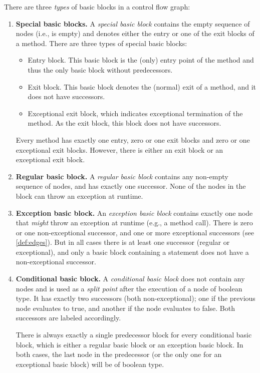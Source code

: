 \begin{definition}
    There are three \emph{types} of basic blocks in a control flow graph:
    \begin{enumerate}
        \item \textbf{Special basic blocks.} A \emph{special basic block} contains
        the empty sequence of nodes (i.e., is empty) and denotes either the
        entry or one of the exit blocks of a method. There are three types
        of special basic blocks:
        \begin{itemize}
            \item Entry block. This basic block is the (only) entry point of the
            method and thus the only basic block without predecessors.
            \item Exit block. This basic block denotes the (normal) exit of
            a method, and it does not have successors.
            \item Exceptional exit block, which indicates exceptional termination
            of the method. As the exit block, this block does not have successors.
        \end{itemize}
        Every method has exactly one entry, zero or one exit blocks and zero or one
        exceptional exit blocks. However, there is either an exit block or an exceptional
        exit block.
        \item \textbf{Regular basic block.} A \emph{regular basic block} contains
        any non-empty sequence of nodes, and has exactly one successor.
        None of the nodes in the block can throw an exception at runtime.
        \item \textbf{Exception basic block.} An \emph{exception basic block} contains exactly
        one node that \emph{might} throw an exception at runtime (e.g., a method call).
        There is zero or one non-exceptional successor, and one
        or more exceptional successors (see \autoref{def:edges}). But in all cases there
        is at least one successor (regular or exceptional), and only a basic block
        containing a  statement does not have a non-exceptional successor.
        \item \textbf{Conditional basic block.} A \emph{conditional basic block}
        does not contain any nodes and is used as a \emph{split point} after the execution
        of a node of boolean type. It has exactly two successors (both non-exceptional); one
        if the previous node evaluates to true, and another
        if the node evaluates to false. Both successors are labeled accordingly.
        
        There is always exactly a single predecessor block for every conditional basic block, which
        is either a regular basic block or an exception basic block. In both cases, the last node
        in the predecessor (or the only one for an exceptional basic block) will be of boolean type.
    \end{enumerate}
\end{definition}

